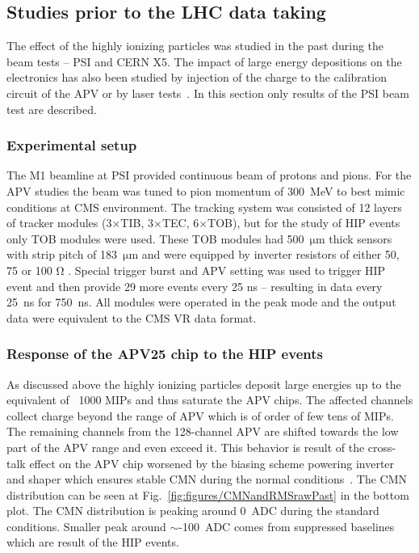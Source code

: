 \subsection{Studies prior to the LHC data taking~\label{sec:HIPinPast}}

The effect of the highly ionizing particles was studied in the past during the beam tests -- PSI and CERN X5. The impact of large energy depositions on the electronics has also been studied by injection of the charge to the calibration circuit of the APV or by laser tests~\cite{Adam:2005pz}. In this section only results of the PSI beam test are described.

\subsubsection{Experimental setup}

The M1 beamline at PSI provided continuous beam of protons and pions. For the APV studies the beam was tuned to pion momentum of 300~MeV to best mimic conditions at CMS environment. The tracking system was consisted of 12 layers of tracker modules (3$\times$TIB, 3$\times$TEC, 6$\times$TOB), but for the study of HIP events only TOB modules were used. These TOB modules had 500~$\mathrm{\mu m}$ thick sensors with strip pitch of 183~$\mathrm{\mu}$m and were equipped by inverter resistors of either 50, 75 or 100 $\mathrm{\Omega}$ . Special trigger burst and APV setting was used to trigger HIP event and then provide 29 more events every 25 ns -- resulting in data every 25~ns for 750~ns. All modules were operated in the peak mode and the output data were equivalent to the CMS VR data format. 




\subsubsection{Response of the APV25 chip to the HIP events}

As discussed above the highly ionizing particles deposit large energies up to the equivalent of ~1000 MIPs and thus saturate the APV chips. The affected channels collect charge beyond the range of APV which is of order of few tens of MIPs. The remaining channels from the 128-channel APV are shifted towards the low part of the APV range and even exceed it. This behavior is result of the cross-talk effect on the APV chip worsened by the biasing scheme powering inverter and shaper which ensures stable CMN during the normal conditions~\cite{Bainbridge:2004jc}. The CMN distribution can be seen at Fig.~\ref{fig:figures/CMNandRMSrawPast} in the bottom plot. The CMN distribution is peaking around 0~ADC during the standard conditions. Smaller peak around $\sim$-100~ADC comes from suppressed baselines which are result of the HIP events. 

